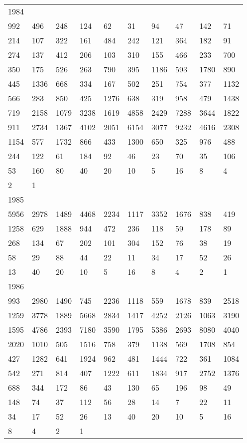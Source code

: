 \begin{longtable}{*{10}{l}}
1984&&&&&&&&&\\
992& 496& 248& 124& 62& 31& 94& 47& 142& 71\\
214& 107& 322& 161& 484& 242& 121& 364& 182& 91\\
274& 137& 412& 206& 103& 310& 155& 466& 233& 700\\
350& 175& 526& 263& 790& 395& 1186& 593& 1780& 890\\
445& 1336& 668& 334& 167& 502& 251& 754& 377& 1132\\
566& 283& 850& 425& 1276& 638& 319& 958& 479& 1438\\
719& 2158& 1079& 3238& 1619& 4858& 2429& 7288& 3644& 1822\\
911& 2734& 1367& 4102& 2051& 6154& 3077& 9232& 4616& 2308\\
1154& 577& 1732& 866& 433& 1300& 650& 325& 976& 488\\
244& 122& 61& 184& 92& 46& 23& 70& 35& 106\\
53& 160& 80& 40& 20& 10& 5& 16& 8& 4\\
2& 1& \\

1985&&&&&&&&&\\
5956& 2978& 1489& 4468& 2234& 1117& 3352& 1676& 838& 419\\
1258& 629& 1888& 944& 472& 236& 118& 59& 178& 89\\
268& 134& 67& 202& 101& 304& 152& 76& 38& 19\\
58& 29& 88& 44& 22& 11& 34& 17& 52& 26\\
13& 40& 20& 10& 5& 16& 8& 4& 2& 1\\

1986&&&&&&&&&\\
993& 2980& 1490& 745& 2236& 1118& 559& 1678& 839& 2518\\
1259& 3778& 1889& 5668& 2834& 1417& 4252& 2126& 1063& 3190\\
1595& 4786& 2393& 7180& 3590& 1795& 5386& 2693& 8080& 4040\\
2020& 1010& 505& 1516& 758& 379& 1138& 569& 1708& 854\\
427& 1282& 641& 1924& 962& 481& 1444& 722& 361& 1084\\
542& 271& 814& 407& 1222& 611& 1834& 917& 2752& 1376\\
688& 344& 172& 86& 43& 130& 65& 196& 98& 49\\
148& 74& 37& 112& 56& 28& 14& 7& 22& 11\\
34& 17& 52& 26& 13& 40& 20& 10& 5& 16\\
8& 4& 2& 1& \\


\end{longtable}
